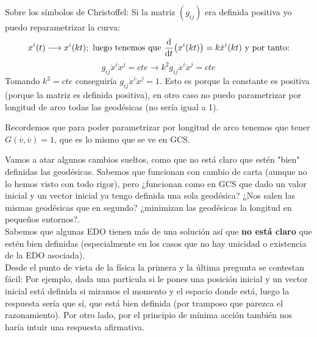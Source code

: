 \documentclass[palatino, bibnumbers]{apuntes}
\begin{document}
Sobre los símbolos de Christoffel: Si la matriz $(g_{ij})$ era definida positiva yo puedo reparametrizar la curva: $$x^i(t)\longrightarrow x^i(kt); \text{ luego tenemos que } \dv{t}(x^i(kt))=k\dot{x}^i(kt)\text{ y por tanto:}$$$$ g_{ij}\dot{x}^i\dot{x}^j=cte\longrightarrow  k^2g_{ij}\dot{x}^i\dot{x}^j=cte$$
Tomando $k^2=cte$ conseguiría $g_{ij}\dot{x}^i\dot{x}^j=1$. Esto es porque la constante es positiva (porque la matriz es definida positiva), en otro caso no puedo parametrizar por longitud de arco todas las geodésicas (no sería igual a 1).
\begin{obs}Recordemos que para poder parametrizar por longitud de arco tenemos que tener $G(\overline{v},\overline{v})=1$, que es lo mismo que se ve en GCS.
\end{obs}

Vamos a atar algunos cambios sueltos, como que no está claro que estén "bien" definidas las geodésicas. Sabemos que funcionan con cambio de carta (aunque no lo hemos visto con todo rigor), pero ¿funcionan como en GCS que dado un valor inicial y un vector inicial ya tengo definida una sola geodésica? ¿Nos salen las mismas geodésicas que en segundo? ¿minimizan las geodésicas la longitud en pequeños entornos?.\\ \indent Sabemos que algunas EDO tienen más de una solución así que \textbf{no está claro} que estén bien definidas (especialmente en los casos que no hay unicidad o existencia de la EDO asociada). \\ \indent Desde el punto de vista de la física la primera y la última pregunta se contestan fácil: Por ejemplo, dada una partícula si le pones una posición inicial y un vector inicial está definida si miramos el momento y el espacio donde está, luego la respuesta sería que sí, que está bien definida (por tramposo que parezca el razonamiento). Por otro lado, por el principio de mínima acción también nos haría intuir una respuesta afirmativa.\\
\end{document}
